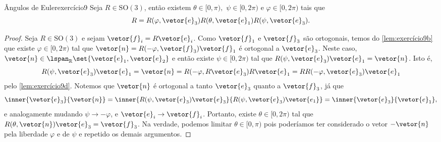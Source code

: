 \begin{proposition}{Ângulos de Euler}{exercício9}
    Seja \(R \in \mathrm{SO}(3)\), então existem \(\theta \in [0,\pi),\) \(\psi \in [0,2\pi)\) e \(\varphi \in [0,2\pi)\) tais que
    \begin{equation*}
        R = R(\varphi, \vetor{e}_3)R(\theta, \vetor{e}_1)R(\psi, \vetor{e}_3).
    \end{equation*}
\end{proposition}
\begin{proof}
    Seja \(R \in \mathrm{SO}(3)\) e sejam \(\vetor{f}_i = R\vetor{e}_i\). Como \(\vetor{f}_1\) e \(\vetor{f}_3\) são ortogonais, temos do \cref{lem:exercício9b} que existe \(\varphi \in [0,2\pi)\) tal que \(\vetor{n} = R(-\varphi, \vetor{f}_3)\vetor{f}_1\) é ortogonal a \(\vetor{e}_3\). Neste caso, \(\vetor{n} \in \lspan_{\mathbb{R}}\set{\vetor{e}_1,\vetor{e}_2}\) e então existe \(\psi \in [0,2\pi)\) tal que \(R(\psi, \vetor{e}_3)\vetor{e}_1 = \vetor{n}\). Isto é,
    \begin{equation*}
        R(\psi, \vetor{e}_3)\vetor{e}_1 = \vetor{n} = R(-\varphi, R\vetor{e}_3)R\vetor{e}_1 = R R(-\varphi,\vetor{e}_3)\vetor{e}_1
    \end{equation*}
    pelo \cref{lem:exercício9d}. Notemos que \(\vetor{n}\) é ortogonal a tanto \(\vetor{e}_3\) quanto a \(\vetor{f}_3\), já que
    \begin{equation*}
        \inner{\vetor{e}_3}{\vetor{n}} = \inner{R(\psi,\vetor{e}_3)\vetor{e}_3}{R(\psi,\vetor{e}_3)\vetor{e_1}} = \inner{\vetor{e}_3}{\vetor{e}_1},
    \end{equation*}
    e analogamente mudando \(\psi \to -\varphi\), e \(\vetor{e}_i \to \vetor{f}_i\). Portanto, existe \(\theta \in [0,2\pi)\) tal que \(R(\theta, \vetor{n})\vetor{e}_3 = \vetor{f}_3\). Na verdade, podemos limitar \(\theta \in [0, \pi)\) pois poderíamos ter considerado o vetor \(-\vetor{n}\) pela liberdade \(\varphi\) e de \(\psi\) e repetido os demais argumentos.


\end{proof}
